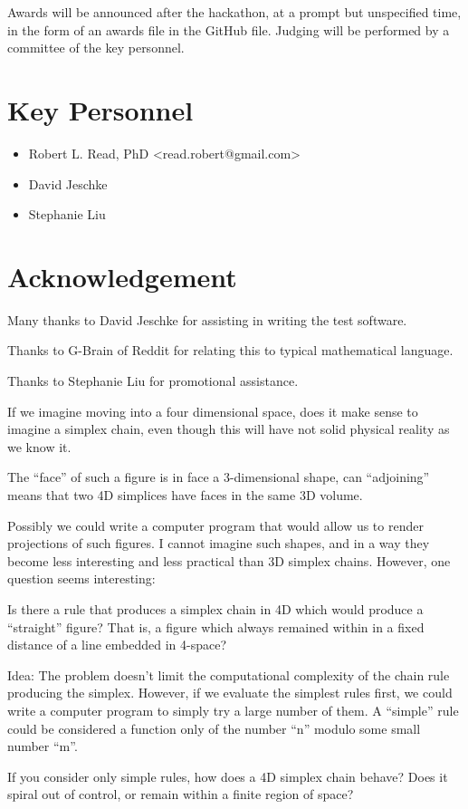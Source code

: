 \documentclass[11pt]{article}
\begin{document}
Awards will be announced after the hackathon, at a prompt but unspecified time, in the form of an
awards file in the GitHub file. Judging will be performed by a committee of the key personnel.

\section{Key Personnel}

\begin{itemize}
\item Robert L. Read, PhD  <read.robert@gmail.com>
\item David Jeschke
  \item Stephanie Liu
\end{itemize}


\section{Acknowledgement}

Many thanks to David Jeschke for assisting in writing the test software.

Thanks to G-Brain of Reddit for relating this to typical mathematical language.

Thanks to Stephanie Liu for promotional assistance.


If we imagine moving into a four dimensional space, does it make sense to imagine a simplex chain, even though this will have
not solid physical reality as we know it.

The ``face'' of such a figure is in face a 3-dimensional shape, can ``adjoining'' means that two 4D simplices have faces in the same 3D volume.

Possibly we could write a computer program that would allow us to render projections of such figures.
I cannot imagine such shapes, and in a way they become less interesting and less practical than 3D simplex chains.
However, one question seems interesting:

Is there a rule that produces a simplex chain in 4D which would produce a ``straight'' figure?
That is, a figure which always remained within in a fixed distance of a line embedded in 4-space?

Idea: The problem doesn't limit the computational complexity of the chain rule producing the simplex.
However, if we evaluate the simplest rules first, we could write a computer program to simply try a large number
of them. A ``simple'' rule could be considered a function only of the number ``n'' modulo some small number ``m''.

If you consider only simple rules, how does a 4D simplex chain behave? Does it spiral out of control, or remain within
a finite region of space? 




\end{document}
